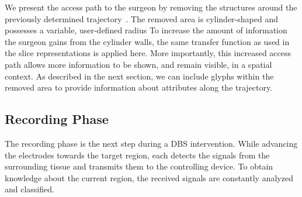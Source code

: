 \documentclass{vgtc}                          %
\begin{document}
We present the access path to the surgeon by removing the structures around the previously determined trajectory~\cite{Weiskopf2002,Rieder2008}. The removed area is cylinder-shaped and possesses a variable, user-defined radius
To increase the amount of information the surgeon gains from the cylinder walls, the same transfer function as used in the slice representations is applied here. More importantly, this increased access path allows more information to be shown, and remain visible, in a spatial context. As described in the next section, we can include glyphs within the removed area to provide information about attributes along the trajectory.
%

\subsection{Recording Phase}\label{sec:overview:recording}
The recording phase is the next step during a DBS intervention. While advancing the electrodes towards the target region, each detects the signals from the surrounding tissue and transmits them to the controlling device. To obtain knowledge about the current region, the received signals are constantly analyzed and classified.
\end{document}
